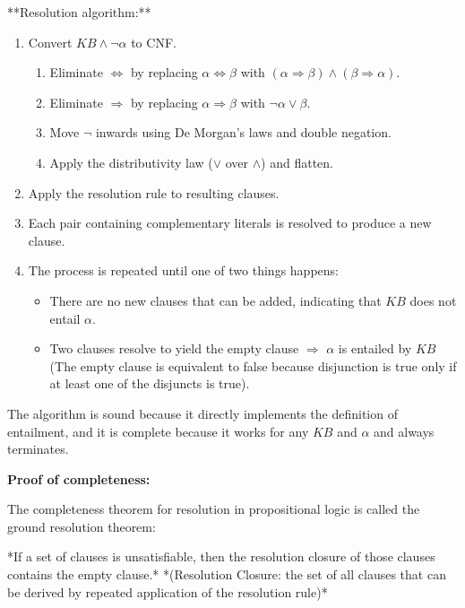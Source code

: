 \documentclass[12pt]{article}
\begin{document}
\begin{enumerate}[label=\textbf{PL.\arabic*}]
          **Resolution algorithm:**
          \begin{enumerate}[label=\arabic*.]
              \item Convert $KB \land \neg\alpha$ to CNF.
                    \begin{enumerate}
                        \item Eliminate $\Leftrightarrow$ by replacing $\alpha \Leftrightarrow \beta$ with $(\alpha \Rightarrow \beta) \land (\beta \Rightarrow \alpha)$.
                        \item Eliminate $\Rightarrow$ by replacing $\alpha \Rightarrow \beta$ with $\neg\alpha \lor \beta$.
                        \item Move $\lnot$ inwards using De Morgan's laws and double negation.
                        \item Apply the distributivity law ($\lor$ over $\land$) and flatten.
                    \end{enumerate}
              \item Apply the resolution rule to resulting clauses.
              \item Each pair containing complementary literals is resolved to produce a new clause.
              \item The process is repeated until one of two things happens:
                    \begin{itemize}
                        \item There are no new clauses that can be added, indicating that $KB$ does not entail $\alpha$.
                        \item Two clauses resolve to yield the empty clause $\Rightarrow$ $\alpha$ is entailed by $KB$ (The empty clause is equivalent to false because disjunction is true only if at least one of the disjuncts is true).
                    \end{itemize}
          \end{enumerate}

          The algorithm is sound because it directly implements the definition of entailment, and it is complete because it works for any $KB$ and $\alpha$ and always terminates.

          \textbf{Proof of completeness:}

          The completeness theorem for resolution in propositional logic is called the ground resolution theorem:
          \begin{center}
              *If a set of clauses is unsatisfiable, then the resolution closure of those clauses contains the empty clause.*
              *(Resolution Closure: the set of all clauses that can be derived by repeated application of the resolution rule)*
          \end{center}


\end{enumerate}
\end{document}
